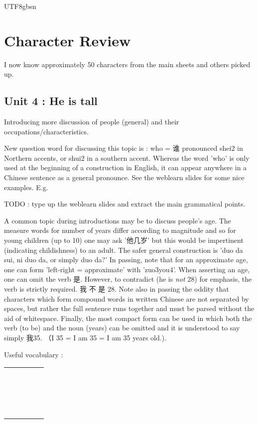 \documentclass{article}
\newcommand{\myfont}{gbsn} %
\newcommand{\cvctp}[4]{#1 & \xpinyin*{#1} & \pinyin{#2} & #3 & #4 \\ \hline}
\begin{document}
\begin{CJK}{UTF8}{\myfont}
\section{Character Review}

I now know approximately 50 characters from the main sheets and others picked up.

\subsection{Unit 4 : He is tall }

Introducing more discussion of people (general) and their occupations/characteristics.

New question word for discussing this topic is : who = 谁 pronounced shei2 in Northern accents, or shui2 in a southern accent.  Whereas the word 'who' is only used at the beginning of a construction in English, it can appear anywhere in a Chinese sentence as a general pronounce.   See the weblearn slides for some nice examples.   E.g.  

TODO : type up the weblearn slides and extract the main grammatical points.

A common topic during introductions may be to discuss people's age.   The measure words for number of years differ according to magnitude and so for young children (up to 10) one may ask '他几岁' but this would be impertinent (indicating childishness) to an adult.  The safer general construction is 'duo da sui, ni duo da, or simply duo da?' In passing, note that for an approximate age, one can form 'left-right = approximate' with 'zuo3you4'.   When asserting an age, one can omit the verb 是.   However, to contradict (he is {\it not} 28) for emphasis, the verb is strictly required. 我 不 是 28.  Note also in passing the oddity that characters which form compound words in written Chinese are not separated by spaces, but rather the full sentence runs together and must be parsed without the aid of whitespace.   Finally, the most compact form can be used in which both the verb (to be) and the noun (years) can be omitted and it is understood to say simply 我35. （I 35 = I am 35 = I am 35 years old.).

  
Useful vocabulary :

    \begin{tabular}{|l|l|l|l|l|} \hline
      \cvctp{}{}{}{}
      \cvctp{}{}{}{}
      \cvctp{}{}{}{}
      \cvctp{}{}{}{}
      \cvctp{}{}{}{}
      \cvctp{}{}{}{}
      \cvctp{}{}{}{}
      \cvctp{}{}{}{}
      \cvctp{}{}{}{}
      \cvctp{}{}{}{}
      \cvctp{}{}{}{}
      \cvctp{}{}{}{}
      \cvctp{}{}{}{}
      \cvctp{}{}{}{}
      \cvctp{}{}{}{}
      \cvctp{}{}{}{}
      \cvctp{}{}{}{}
      \cvctp{}{}{}{}
      

\end{tabular}
\end{CJK}
\end{document}
